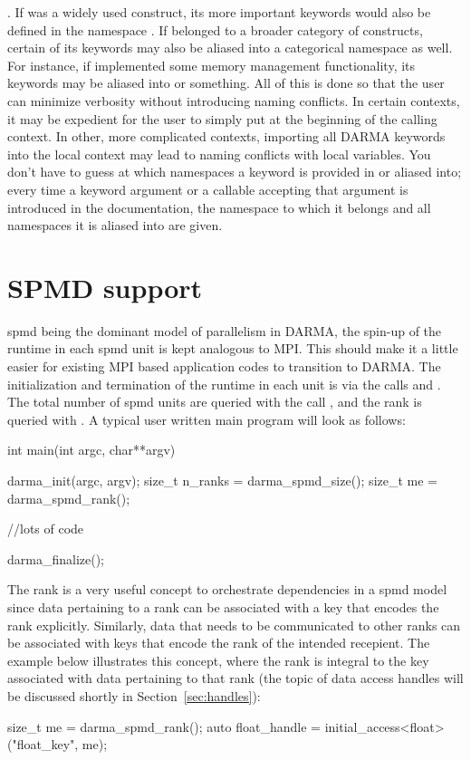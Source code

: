 .
If  was a 
widely used construct, its more important keywords would also be defined in the namespace
.  If  belonged to a broader category of 
constructs, certain of its keywords may also be aliased into a categorical namespace
as well.  For instance, if  implemented some memory management functionality,
its keywords may be aliased into  or 
something.  All of this is done so that the user can minimize verbosity without introducing
naming conflicts.  In certain contexts, it may be expedient for the user to simply
put  at the beginning of the calling context.  In other,
more complicated contexts, importing all DARMA keywords into the local context may
lead to naming conflicts with local variables.  You don't have to guess at which namespaces
a keyword is provided in or aliased into; every time a keyword argument or a callable
accepting that argument is introduced in the documentation, the namespace to which 
it belongs and all namespaces it is aliased into are given.



\section{SPMD support}
\label{sec:spmd}
\gls{spmd} being the dominant model of parallelism in DARMA, the spin-up of the
runtime in each \gls{spmd} unit is 
kept analogous to MPI. This should make it a little easier for existing MPI based application codes to transition 
to DARMA. The initialization and termination of the runtime in each unit is via the calls 
and . The total number of \gls{spmd} units are queried with the call ,
and the rank is queried with . A typical user written main program will look as follows:
\begin{CppCode}
int main(int argc, char**argv){

	darma_init(argc, argv);
	size_t n_ranks = darma_spmd_size();
	size_t me = darma_spmd_rank();

	//lots of code

	darma_finalize();
}
\end{CppCode}

The rank is a very useful concept to orchestrate dependencies in a \gls{spmd} model since data pertaining to a rank can be associated
with a key that encodes the rank explicitly. Similarly, data that needs to be communicated to other ranks can be associated with
keys that encode the rank of the intended recepient. The example below illustrates this concept, where the rank is integral to
the key associated with data pertaining to that rank (the topic of data access
handles will be discussed shortly in Section~\ref{sec:handles}):
\begin{CppCode}
size_t me = darma_spmd_rank();
auto float_handle = initial_access<float>("float_key", me);
\end{CppCode}  

